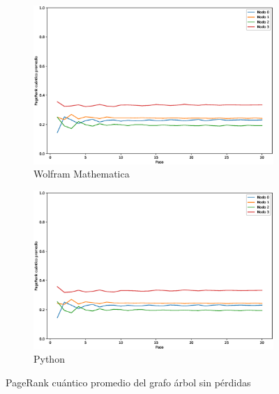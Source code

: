 \documentclass[xetex,mathserif,serif]{beamer}
\begin{document}
\begin{frame}
\begin{figure}[H]
    \centering
    \begin{subfigure}[m]{0.45\textwidth}
        \centering
        \includegraphics[width=0.9\linewidth]{img/tree-mean-M.eps}
        \caption{Wolfram Mathematica}
    \end{subfigure}
    \begin{subfigure}[m]{0.45\textwidth}
        \centering
        \includegraphics[width=0.9\linewidth]{img/tree-mean-lossless.eps}
        \caption{Python}
    \end{subfigure}
    \caption[PageRank cuántico promedio del grafo árbol sin pérdidas]{PageRank cuántico promedio del grafo árbol sin pérdidas}
    \label{fig:meantreelossless}
\end{figure}


\end{frame}
\end{document}
